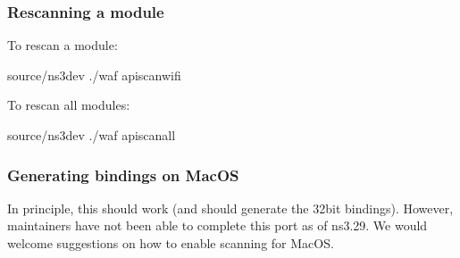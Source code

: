 \documentclass[letterpaper,10pt,english]{sphinxmanual}
\begin{document}
\subsubsection{Rescanning a module}
\label{\detokenize{python:rescanning-a-module}}
To re\sphinxhyphen{}scan a module:

\begin{sphinxVerbatim}[commandchars=\\\{\}]
\PYGZdl{}  source/ns\PYGZhy{}3\PYGZhy{}dev
\PYGZdl{} ./waf \PYGZhy{}\PYGZhy{}apiscanwifi
\end{sphinxVerbatim}

To re\sphinxhyphen{}scan all modules:

\begin{sphinxVerbatim}[commandchars=\\\{\}]
\PYGZdl{}  source/ns\PYGZhy{}3\PYGZhy{}dev
\PYGZdl{} ./waf \PYGZhy{}\PYGZhy{}apiscanall
\end{sphinxVerbatim}


\subsubsection{Generating bindings on MacOS}
\label{\detokenize{python:generating-bindings-on-macos}}
In principle, this should work (and should generate the 32\sphinxhyphen{}bit bindings).
However, maintainers have not been able to complete this port as of ns\sphinxhyphen{}3.29.
We would welcome suggestions on how to enable scanning for MacOS.
\end{document}
